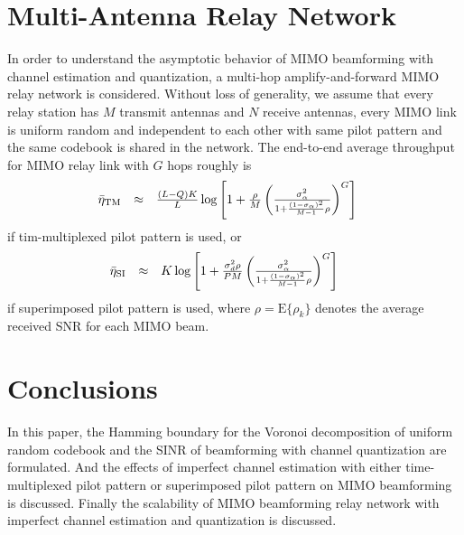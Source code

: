 \documentclass[10pt,fleqn, twocolumn]{IEEEtran}
\begin{document}
\section{Multi-Antenna Relay Network}
In order to understand the asymptotic behavior of MIMO beamforming
with channel estimation and quantization, a multi-hop
amplify-and-forward MIMO relay network is considered. Without loss
of generality, we assume that every relay station has $M$ transmit
antennas and $N$ receive antennas, every MIMO link is uniform
random and independent to each other with same pilot pattern and
the same codebook is shared in the network. The end-to-end average
throughput for MIMO relay link with $G$ hops roughly is
\begin{equation}\hspace{-0.15in}
\begin{array}{rcl}
\bar\eta_{\rm
TM}&\approx&\frac{(L-Q)K}{L}\log\left[1+\frac{\rho}{M}\left(\frac{\sigma_{\alpha}^{2}}{1+\frac{(1-\sigma_{\alpha})^2}{M-1}\rho}\right)^{G}\right]
\end{array}\label{RN_TM}
\end{equation}
\noindent if tim-multiplexed pilot pattern is used, or
\begin{equation}\hspace{-0.23in}
\begin{array}{rcl}
\bar\eta_{\rm
SI}&\approx&K\log\left[1+\frac{\sigma_{d}^{2}\rho}{PM}\left(\frac{\sigma_{\alpha}^{2}}{1+\frac{(1-\sigma_{\alpha})^2}{M-1}\rho}\right)^{G}\right]
\end{array}\label{RN_SI}
\end{equation}
\noindent if superimposed pilot pattern is used, where
$\rho=\mbox{E}\{\rho_{k}\}$ denotes the average received SNR for
each MIMO beam.

\section{Conclusions}
In this paper, the Hamming boundary for the Voronoi decomposition
of uniform random codebook and the SINR of beamforming with
channel quantization are formulated. And the effects of imperfect
channel estimation with either time-multiplexed pilot pattern or
superimposed pilot pattern on MIMO beamforming is discussed.
Finally the scalability of MIMO beamforming relay network with
imperfect channel estimation and quantization is discussed.

\small


\end{document}
